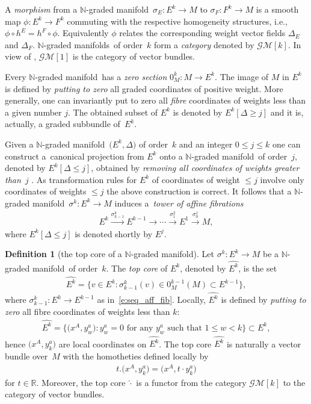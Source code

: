 \documentclass[pdftex]{sigma}
\newcommand{\grB}{{$\N$-graded manifold}}
\newcommand{\grBs}{{$\N$-graded manifolds}}
\newcommand{\degree}{{order}}
\newcommand{\R}{\mathbb{R}}
\newcommand{\N}{\mathbb{N}}
\newcommand{\ra}{\rightarrow}
\newcommand{\core}[1]{\widehat{#1}} %
\newcommand{\catGB}{\mathcal{GM}}
\numberwithin{equation}{section}
\theoremstyle{definition}
\newtheorem{df}[thm]{Definition}
\begin{document}
 A \emph{morphism} from a \grB\ $\sigma_E\colon E^k\ra M$ to $\sigma_F\colon F^k \ra M$ is a smooth map $\phi\colon E^k\ra F^k$ commuting with the respective homogeneity structures, i.e., $\phi \circ h^E = h^F\circ \phi$. Equivalently $\phi$ relates the corresponding weight vector fields $\Delta_E$ and $\Delta_F$. \grBs\ of \degree\ $k$ form a \emph{category} denoted by $\catGB[k]$. In view of \cite[Theorem 2.4]{JG_MR_hi_VB_2009}, $\catGB[1]$ is the category of vector bundles.

Every \grB\ has a \emph{zero section} $0_M^k\colon M\ra E^k$. The image of $M$ in $E^k$ is defined by \emph{putting to zero} \cite[Example 1.10]{BGR} all graded coordinates of positive weight. More generally, one can invariantly put to zero all \emph{fibre} coordinates of weights less than a given number $j$. The obtained subset of $E^k$ is denoted by $E^k[\Delta \geq j]$ and it is, actually, a graded subbundle of~$E^k$.

Given a \grB\ $\big(E^k, \Delta\big)$ of \degree\ $k$ and an integer $0\leq j\leq k$ one can
construct a~canonical projection from $E^k$ onto a \grB\ of \degree\ $j$, denoted by \mbox{$E^k[\Delta\leq j]$}, obtained by \emph{removing all coordinates of weights greater than}~$j$ \cite[Definition~1.6]{BGR}. As transformation rules for $E^k$ of coordinates of weight $\leq j$ involve only coordinates of weights $\leq j$ the above construction is correct. It follows that
a \grB\ $\sigma^k\colon E^k\to M$ induces a~\emph{tower of affine fibrations}~\cite{Voronov_2002}
\begin{gather}\label{e:seq_aff_fib}
E^k\xrightarrow{\sigma^k_{k-1}} E^{k-1}\to\cdots \xrightarrow{\sigma^2_1} E^1\xrightarrow{\sigma^1_0} M,
\end{gather}
where $E^k[\Delta\leq j]$ is denoted shortly by $E^j$.

\begin{df}[the top core of a \grB]
Let $\sigma^k\colon E^k\ra M$ be a \grB\ of \degree\ $k$. The \emph{top core} of $E^k$, denoted by $\core{E^k}$, is the set
\begin{gather*}
\core{E^k} = \big\{ v\in E^k\colon \sigma^k_{k-1} (v) \in 0_M^{k-1}(M) \subset E^{k-1} \big\},
\end{gather*}
where $\sigma^k_{k-1}\colon E^k\ra E^{k-1}$ as in~\eqref{e:seq_aff_fib}. Locally, $\core{E^k}$ is defined by \emph{putting to zero} all fibre coordinates of weights less than $k$:
\begin{gather*}
 \core{E^k} = \big\{\big(x^A, y^a_w\big)\colon y^a_w=0 \text{ for any } y^a_w \text{ such that } 1\leq w < k\big\} \subset E^k,
 \end{gather*}
hence $\big(x^A, y^a_k\big)$ are local coordinates on $\core{E^k}$. The top core $\core{E^k}$ is naturally a vector bundle over~$M$ with the homotheties defined locally by
\begin{gather*} t.\big(x^A, y^a_k\big) = \big(x^A, t\cdot y^a_k\big)
\end{gather*}
for $t\in\R$. Moreover, the top core $\core{\cdot}$ is a functor from the category $\catGB[k]$ to the category of vector bundles.
\end{df}
\end{document}
